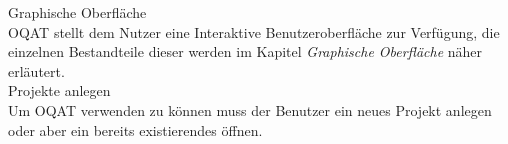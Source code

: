  Graphische Oberfläche \\
\gls{OQAT} stellt dem Nutzer eine Interaktive Benutzeroberfläche zur Verfügung, die
einzelnen Bestandteile dieser werden im Kapitel \emph{Graphische Oberfläche} näher erläutert.\\
 Projekte anlegen \\
Um \gls{OQAT} verwenden zu können muss der Benutzer ein neues Projekt anlegen oder aber
ein bereits existierendes öffnen. \\
